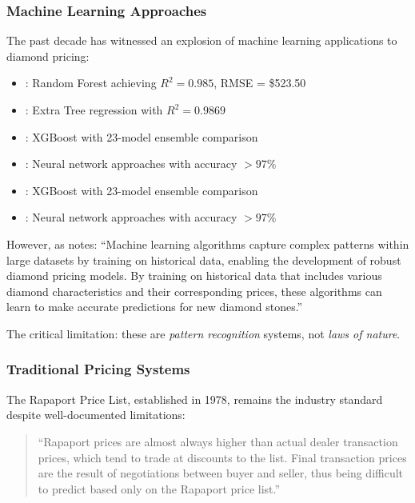 \documentclass[12pt,a4paper]{article}
\theoremstyle{definition}
\theoremstyle{remark}
\begin{document}
\subsubsection{Machine Learning Approaches}

The past decade has witnessed an explosion of machine learning applications to diamond pricing:

\begin{itemize}
\item \citet{sharma2023diamond}: Random Forest achieving $R^2 = 0.985$, RMSE = \$523.50
\item \citet{kumar2024diamond}: Extra Tree regression with $R^2 = 0.9869$
\item \citet{patel2024predictive}: XGBoost with 23-model ensemble comparison
\item \citet{alsuraihi2020machine}: Neural network approaches with accuracy $>97\%$
\item \citet{patel2024predictive}: XGBoost with 23-model ensemble comparison

\item \citet{alsuraihi2020machine}: Neural network approaches with accuracy $>97\%$

\end{itemize}

However, as \citet{chu2017pricing} notes: ``Machine learning algorithms capture complex patterns within large datasets by training on historical data, enabling the development of robust diamond pricing models. By training on historical data that includes various diamond characteristics and their corresponding prices, these algorithms can learn to make accurate predictions for new diamond stones.''

The critical limitation: these are \textit{pattern recognition} systems, not \textit{laws of nature}.

\subsubsection{Traditional Pricing Systems}

The Rapaport Price List, established in 1978, remains the industry standard despite well-documented limitations:

\begin{quote}
``Rapaport prices are almost always higher than actual dealer transaction prices, which tend to trade at discounts to the list. Final transaction prices are the result of negotiations between buyer and seller, thus being difficult to predict based only on the Rapaport price list.'' \citep{chu2017pricing}
\end{quote}
\end{document}
